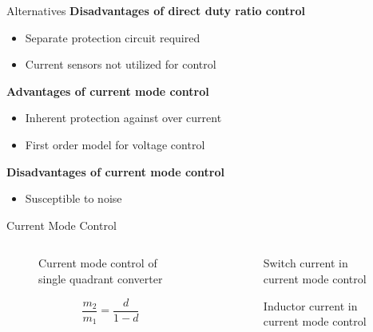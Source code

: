 \documentclass[10pt]{beamer}
\begin{document}
\begin{frame}{Alternatives}
\textbf{Disadvantages of direct duty ratio control}
\begin{itemize}
\item Separate protection circuit required
\item Current sensors not utilized for control
\end{itemize}
\textbf{Advantages of current mode control}
\begin{itemize}
\item Inherent protection against over current
\item First order model for voltage control
\end{itemize}
\textbf{Disadvantages of current mode control}
\begin{itemize}
\item Susceptible to noise
\end{itemize}
\end{frame}

\begin{frame}{Current Mode Control}
\begin{columns}
\begin{column}{0.5\textwidth}
  \begin{figure}
    \centering
    
    \caption{Current mode control of single quadrant converter}
    \label{fig:16}
  \end{figure}
    \begin{equation}
    \dfrac{m_2}{m_1} = \dfrac{d}{1-d}
    \label{eq:4}
  \end{equation}
\end{column}
\begin{column}{0.5\textwidth}
  \begin{figure}
    \centering
    
    \vspace{-0.85cm}
    \caption{Switch current in current mode control}
    \label{fig:17}
  \end{figure}
  \vspace*{-0.8cm}
  \begin{figure}
    \centering
    
    \vspace{-0.9cm}
    \caption{Inductor current in current mode control}
    \label{fig:18}
  \end{figure}
\end{column}
\end{columns}

\end{frame}
\end{document}
